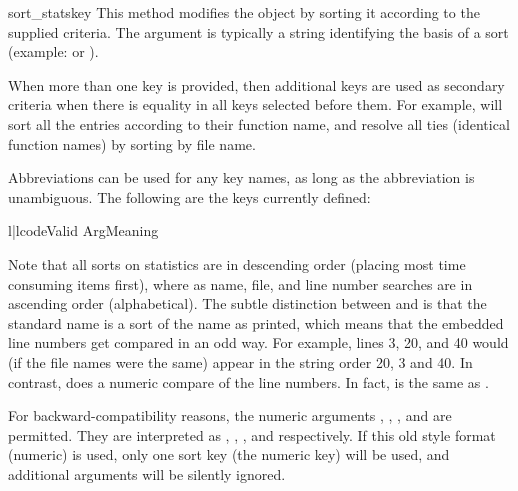 \begin{methoddesc}[Stats]{sort_stats}{key\optional{, \moreargs}}
This method modifies the  object by sorting it according
to the supplied criteria.  The argument is typically a string
identifying the basis of a sort (example:  or
).

When more than one key is provided, then additional keys are used as
secondary criteria when there is equality in all keys selected
before them.  For example,  will sort
all the entries according to their function name, and resolve all ties
(identical function names) by sorting by file name.

Abbreviations can be used for any key names, as long as the
abbreviation is unambiguous.  The following are the keys currently
defined:

\begin{tableii}{l|l}{code}{Valid Arg}{Meaning}
\end{tableii}

Note that all sorts on statistics are in descending order (placing
most time consuming items first), where as name, file, and line number
searches are in ascending order (alphabetical). The subtle
distinction between  and  is that the
standard name is a sort of the name as printed, which means that the
embedded line numbers get compared in an odd way.  For example, lines
3, 20, and 40 would (if the file names were the same) appear in the
string order 20, 3 and 40.  In contrast,  does a numeric
compare of the line numbers.  In fact,  is the
same as .

For backward-compatibility reasons, the numeric arguments
, , , and  are permitted.  They are
interpreted as , , , and
 respectively.  If this old style format (numeric)
is used, only one sort key (the numeric key) will be used, and
additional arguments will be silently ignored.
\end{methoddesc}


